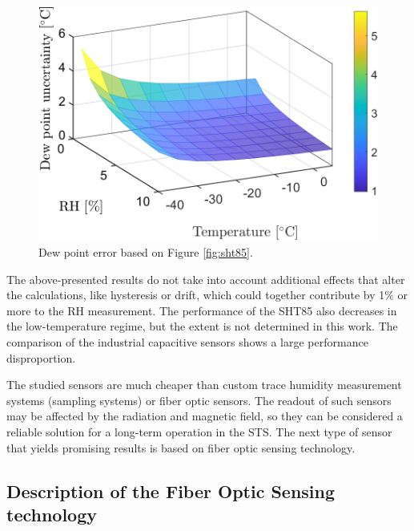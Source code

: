 \begin{figure}[!h]
\centering
\includegraphics[width=0.6\columnwidth]{Chapter5/images/SHTRH15T02.png}
\caption{Dew point error based on Figure \ref{fig:sht85}.}
\label{fig:sht85_dp}
\end{figure}
\newpage
The above-presented results do not take into account additional effects that alter the calculations, like hysteresis or drift, which could together contribute by 1\% or more to the \gls{RH} measurement. The performance of the SHT85 also decreases in the low-temperature regime, but the extent is not determined in this work. The comparison of the industrial capacitive sensors shows a large performance disproportion.

The studied sensors are much cheaper than custom trace humidity measurement systems (sampling systems) or fiber optic sensors. The readout of such sensors may be affected by the radiation and magnetic field, so they can be considered a reliable solution for a long-term operation in the \gls{STS}. The next type of sensor that yields promising results is based on fiber optic sensing technology.

\subsection{Description of the Fiber Optic Sensing technology}
\label{FOS}

